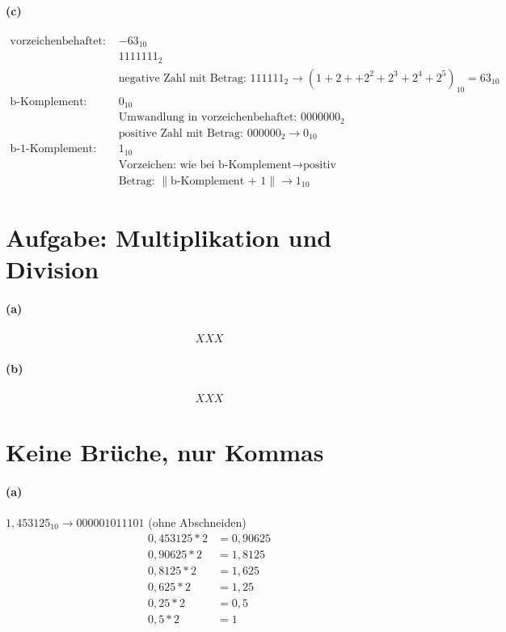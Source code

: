 \documentclass[a4paper]{article}
\begin{document}
\paragraph{(c)}
\begin{align*}
\text{vorzeichenbehaftet: } &-63_{10} \\
	&1111111_{2} \\
	&\text{negative Zahl mit Betrag: } 111111_{2}\rightarrow (1 + 2 + +2^2 + 2^3 + 2^4 + 2^5)_{10} = 63_{10} \\
\text{b-Komplement: } &0_{10} \\
	&\text{Umwandlung in vorzeichenbehaftet: } 0000000_{2} \\
	&\text{positive Zahl mit Betrag: } 000000_{2}\rightarrow 0_{10} \\
\text{b-1-Komplement: } &1_{10} \\
	&\text{Vorzeichen: wie bei b-Komplement} \rightarrow \text{positiv} \\
	&\text{Betrag: $\|$b-Komplement + 1$\|$} \rightarrow 1_{10}
\end{align*}


\section{Aufgabe: Multiplikation und Division}
\paragraph{(a)}
\begin{align*}
XXX
\end{align*}
\paragraph{(b)}
\begin{align*}
XXX
\end{align*}


\section{Keine Brüche, nur Kommas}
\paragraph{(a)}
$1,453125_{10}\rightarrow 000001011101$ (ohne Abschneiden)
\begin{align*}
	0,453125 * 2 &= 0,90625 \\
	0,90625 * 2 &= 1,8125 \\
	0,8125 * 2 &= 1,625 \\
	0,625 * 2 &= 1,25 \\
	0,25 * 2 &= 0,5 \\
	0,5 * 2 &= 1 \\
\end{align*}
\end{document}

